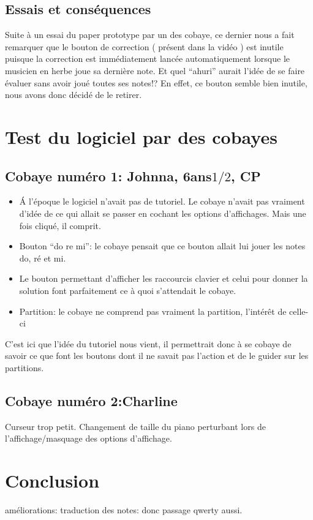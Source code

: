 \documentclass{article}
\begin{document}
\subsection{Essais et conséquences}
Suite à un essai du paper prototype par un des cobaye, ce dernier nous a fait remarquer que le bouton de correction ( présent dans la vidéo )
est inutile puisque la correction est immédiatement lancée automatiquement lorsque le musicien en herbe joue sa dernière note. Et 
quel ``ahuri'' aurait l'idée de se faire évaluer sans avoir joué toutes ses notes!?
En effet, ce bouton semble bien inutile, nous avons donc décidé de le retirer.
\section{Test du logiciel par des cobayes}

\subsection{Cobaye numéro 1: Johnna, 6ans$1/2$, CP}

\begin{itemize}
\item \'A l'époque le logiciel n'avait pas de tutoriel. Le cobaye n'avait pas vraiment d'idée de ce qui allait se passer en cochant les 
options d'affichages. Mais une fois cliqué, il comprit.
\item Bouton ``do re mi'': le cobaye pensait que ce bouton allait lui jouer les notes do, ré et mi.
\item Le bouton permettant d'afficher les raccourcis clavier et celui pour donner la solution font parfaitement ce à quoi s'attendait
le cobaye.
\item Partition: le cobaye ne comprend pas vraiment la partition, l'intérêt de celle-ci
\end{itemize}

C'est ici que l'idée du tutoriel nous vient, il permettrait donc à se cobaye de savoir ce que font les boutons dont il ne savait pas
l'action et de le guider sur les partitions.

\subsection{Cobaye numéro 2:Charline}

Curseur trop petit.
Changement de taille du piano perturbant lors de l'affichage/masquage des options d'affichage.


\section{Conclusion}
améliorations: traduction des notes: donc passage qwerty aussi.
\end{document}
